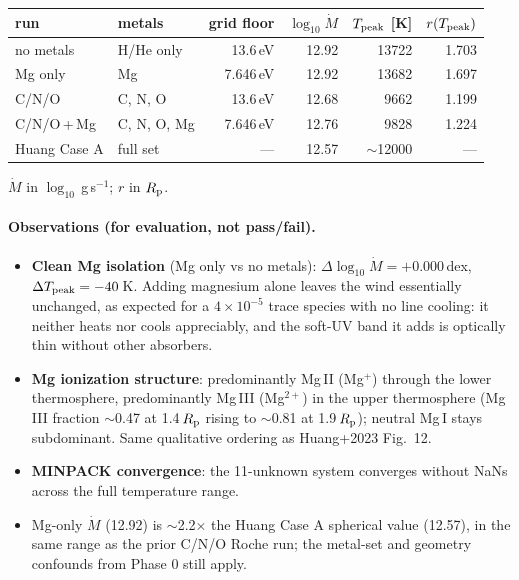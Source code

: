 \documentclass[english,a4paper]{kiseon_memo}
\begin{document}
\begin{center}
\begin{tabular}{llrrrr}
\toprule
run & metals & grid floor & $\log_{10}\dot M$ & $T_{\rm peak}$ [K]
    & $r(T_{\rm peak})$ \\
\midrule
no metals    & H/He only    & 13.6\,eV  & 12.92 & 13722 & 1.703 \\
Mg only      & Mg           & 7.646\,eV & 12.92 & 13682 & 1.697 \\
C/N/O        & C, N, O      & 13.6\,eV  & 12.68 &  9662 & 1.199 \\
C/N/O\,+\,Mg & C, N, O, Mg  & 7.646\,eV & 12.76 &  9828 & 1.224 \\
\midrule
Huang Case A & full set     & ---       & 12.57 & $\sim$12000 & --- \\
\bottomrule
\end{tabular}
\end{center}

\noindent$\dot M$ in $\log_{10}$\,g\,s$^{-1}$; $r$ in $R_{\rm p}$.

\paragraph{Observations (for evaluation, not pass/fail).}
\begin{itemize}
\item \textbf{Clean Mg isolation} (Mg only vs no metals):
  $\Delta\log_{10}\dot M = +0.000$\,dex, $\Delta T_{\rm peak} = -40$\,K. Adding
  magnesium alone leaves the wind essentially unchanged, as expected for a
  $4\times10^{-5}$ trace species with no line cooling: it neither heats nor cools
  appreciably, and the soft-UV band it adds is optically thin without other
  absorbers.
\item \textbf{Mg ionization structure}: predominantly Mg\,II (Mg$^+$) through the
  lower thermosphere, predominantly Mg\,III (Mg$^{2+}$) in the upper thermosphere
  (Mg\,III fraction $\sim$0.47 at 1.4\,$R_{\rm p}$ rising to $\sim$0.81 at
  1.9\,$R_{\rm p}$); neutral Mg\,I stays subdominant. Same qualitative ordering as
  Huang+2023 Fig.\ 12.
\item \textbf{MINPACK convergence}: the 11-unknown system converges without NaNs
  across the full temperature range.
\item Mg-only $\dot M$ (12.92) is $\sim$2.2$\times$ the Huang Case A spherical
  value (12.57), in the same range as the prior C/N/O Roche run; the metal-set
  and geometry confounds from Phase 0 still apply.
\end{itemize}
\end{document}
